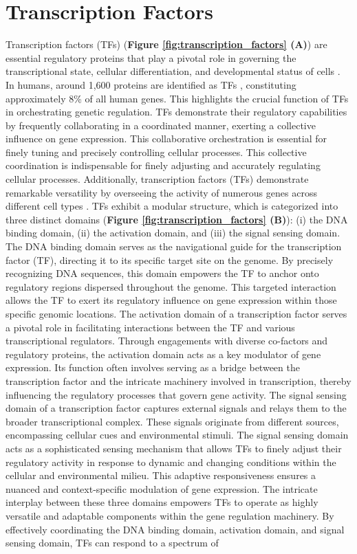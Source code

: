 \documentclass[a4paper, titlepage, openright]{book}
\begin{document}
\section{Transcription Factors}
Transcription factors (TFs) (\textbf{Figure \ref{fig:transcription_factors} (A)}) are essential regulatory proteins that play a pivotal role in governing the transcriptional state, cellular differentiation, and developmental status of cells \citep{lambert2018human, reimold2001plasma, whyte2013master}. In humans, around 1,600 proteins are identified as TFs \citep{babu2004structure}, constituting approximately 8\% of all human genes. This highlights the crucial function of TFs in orchestrating genetic regulation. TFs demonstrate their regulatory capabilities by frequently collaborating in a coordinated manner, exerting a collective influence on gene expression. This collaborative orchestration is essential for finely tuning and precisely controlling cellular processes. This collective coordination is indispensable for finely adjusting and accurately regulating cellular processes. Additionally, transcription factors (TFs) demonstrate remarkable versatility by overseeing the activity of numerous genes across different cell types \citep{lambert2018human}. TFs exhibit a modular structure, which is categorized into three distinct domains \citep{latchman1997transcription} (\textbf{Figure \ref{fig:transcription_factors} (B)}): (i) the DNA binding domain, (ii) the activation domain, and (iii) the signal sensing domain. The DNA binding domain serves as the navigational guide for the transcription factor (TF), directing it to its specific target site on the genome. By precisely recognizing DNA sequences, this domain empowers the TF to anchor onto regulatory regions dispersed throughout the genome. This targeted interaction allows the TF to exert its regulatory influence on gene expression within those specific genomic locations. The activation domain of a transcription factor serves a pivotal role in facilitating interactions between the TF and various transcriptional regulators. Through engagements with diverse co-factors and regulatory proteins, the activation domain acts as a key modulator of gene expression. Its function often involves serving as a bridge between the transcription factor and the intricate machinery involved in transcription, thereby influencing the regulatory processes that govern gene activity. The signal sensing domain of a transcription factor captures external signals and relays them to the broader transcriptional complex. These signals originate from different sources, encompassing cellular cues and environmental stimuli. The signal sensing domain acts as a sophisticated sensing mechanism that allows TFs to finely adjust their regulatory activity in response to dynamic and changing conditions within the cellular and environmental milieu. This adaptive responsiveness ensures a nuanced and context-specific modulation of gene expression. The intricate interplay between these three domains empowers TFs to operate as highly versatile and adaptable components within the gene regulation machinery. By effectively coordinating the DNA binding domain, activation domain, and signal sensing domain, TFs can respond to a spectrum of 
\end{document}
